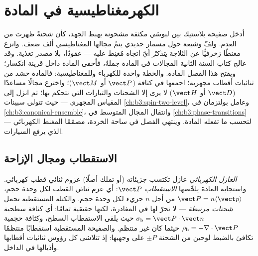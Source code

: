 \chapter{الكهرمغناطيسية في المادة}\label{ch:b3:electromagnetism-in-matter}


أدخل صفيحة بلاستيك بين لبوسَي مكثفة مشحونة يهبط
الجهد، كأن شحنةً ظهرت من العدم. ولفّ وشيعة
حول مسمار حديدي ينمُ مجالها المغناطيسي ألف ضعف. وانزع
مغنطًا زخرفيًّا عن الثلاجة \emph{يتذكرْ} أيّ
اتجاه مُغنِط عليه --- عقودًا، بلا مصدر تغذية. وقد عالج كتاب
السنة الثانية المجالات في المادة جملةً، فأخفى المادة داخل
قرينة انكسار؛ ويفتح هذا الفصل المادة. والخطة
واحدة للكهرباء وللمغناطيسية: فالمادة حشد من
ثنائيات أقطاب مجهرية؛ اجمعها في كثافة ($\vect P$ أو $\vect M$)؛
واخترع مجالًا مساعدًا ($\vect D$ أو $\vect H$) لا يرى إلا
الشحنات والتيارات التي نتحكم بها؛ ثم انزل إلى المقياس المجهري
--- حيث تتولى سبينات \cref{ch:b3:spin-two-level}، وعامل بولتزمان في
\cref{ch:b3:canonical-ensemble}، وانتقال المجال المتوسط في
\cref{ch:b3:phase-transitions} --- لتحسب ما تفعله
المادة. وينتهي الفصل في ساحة الخردة، مصمّمًا
المغنط الكهربائي الذي يرفع السيارات.

\section{الاستقطاب ومجال الإزاحة}

\begin{definition}\label{def:b3:electromagnetism-in-matter:polarisation}
\emph{العازل الكهربائي} عازل تكتسب جزيئاته (أو
تملك أصلًا) عزوم ثنائي قطب كهربائي. واستجابة المادة
يلخّصها \emph{الاستقطاب} $\vect P$: أي عزم ثنائي القطب
لكل وحدة حجم، $\vect P = n\langle\vect p\rangle$ من أجل $n$ جزيء
لكل وحدة حجم. والكتلة المستقطبة تحمل \emph{شحنات مرتبطة} ---
لا تحرّ لها في المغادرة، لكنها حقيقية تمامًا: أي كثافة سطحية
$\sigma_{\text{b}} = \vect P\cdot\vect n$ حيث يلقى الاستقطاب
السطح، وكثافة حجمية $\rho_{\text{b}} =
-\nabla\cdot\vect P$ حيثما كان غير منتظم. والصفيحة
المستقطبة استقطابًا منتظمًا تكافئ بالضبط لوحين من الشحنة $\pm P$
على وجهيها: إذ تتلاشى كل رؤوس ثنائيات أقطابها وأذيالها في الداخل.
\end{definition}

